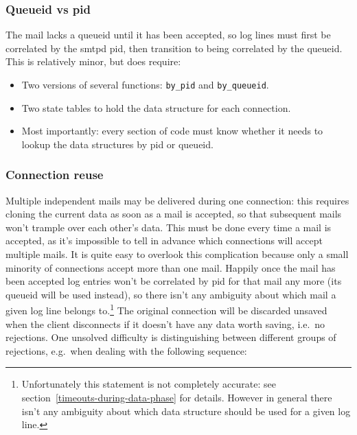 \documentclass[a4paper,12pt,draft]{article}
\begin{document}
\label{complications}


\subsubsection{Queueid vs pid}

The mail lacks a queueid until it has been accepted, so log lines must
first be correlated by the smtpd pid, then transition to being correlated
by the queueid.  This is relatively minor, but does require:

\begin{itemize}

    \item Two versions of several functions: \texttt{by\_pid} and
        \texttt{by\_queueid}.

    \item Two state tables to hold the data structure for each connection.

    \item Most importantly: every section of code must know whether it
        needs to lookup the data structures by pid or queueid.

\end{itemize}

\subsubsection{Connection reuse}

Multiple independent mails may be delivered during one connection: this
requires cloning the current data as soon as a mail is accepted, so that
subsequent mails won't trample over each other's data.  This must be done
every time a mail is accepted, as it's impossible to tell in advance which
connections will accept multiple mails.  It is quite easy to overlook this
complication because only a small minority of connections accept more than
one mail. Happily once the mail has been accepted log entries won't be
correlated by pid for that mail any more (its queueid will be used
instead), so there isn't any ambiguity about which mail a given log line
belongs to.\footnote{Unfortunately this statement is not completely
accurate: see section~\ref{timeouts-during-data-phase} for details.
However in general there isn't any ambiguity about which data structure
should be used for a given log line.}  The original connection will be
discarded unsaved when the client disconnects if it doesn't have any data
worth saving, i.e.\ no rejections.  One unsolved difficulty is
distinguishing between different groups of rejections, e.g.\ when dealing
with the following sequence:
\end{document}

